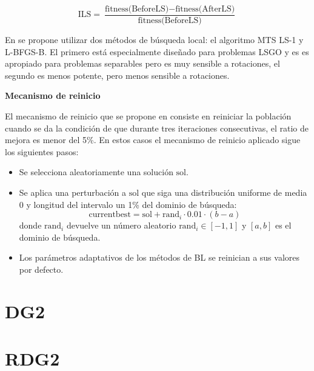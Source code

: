 \[
\text{ILS} = \frac{\text{fitness(BeforeLS)} - \text{fitness(AfterLS)}}{\text{fitness(BeforeLS)}}
\]

\vspace{10px}

En \cite{Molina2018} se propone utilizar dos métodos de búsqueda local: el algoritmo MTS LS-1 y L-BFGS-B. El primero está especialmente diseñado para problemas LSGO y es es apropiado para problemas separables pero es muy sensible a rotaciones, el segundo es menos potente, pero menos sensible a rotaciones.

\vspace{10px}

\noindent\textbf{Mecanismo de reinicio}

El mecanismo de reinicio que se propone en \citep{Molina2018} consiste en reiniciar la población cuando se da la condición de que durante tres iteraciones consecutivas, el ratio de mejora es menor del 5\%. En estos casos el mecanismo de reinicio aplicado sigue los siguientes pasos:

\begin{itemize}
    \item Se selecciona aleatoriamente una solución \( \text{sol} \).
    \item Se aplica una perturbación a \( \text{sol} \) que siga una distribución uniforme de media $0$ y longitud del intervalo un 1\% del dominio de búsqueda:
    \[
    \text{currentbest} = \text{sol} + \text{rand}_{i} \cdot 0.01 \cdot (b - a)
    \]
    donde \( \text{rand}_{i} \) devuelve un número aleatorio \( \text{rand}_{i} \in [-1, 1] \) y \( [a, b] \) es el dominio de búsqueda.
    \item Los parámetros adaptativos de los métodos de BL se reinician a sus valores por defecto.
\end{itemize}

\section{DG2}
\cite{DG2}
\section{RDG2}

\endinput
